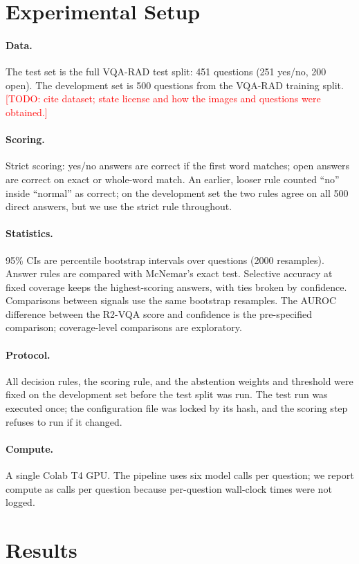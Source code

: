 \documentclass[11pt]{article}
\newcommand{\todo}[1]{\textcolor{red}{[TODO: #1]}}
\begin{document}
\section{Experimental Setup}
\paragraph{Data.} The test set is the full VQA-RAD test split: 451 questions (251 yes/no, 200 open). The development set is 500 questions from the VQA-RAD training split. \todo{cite dataset; state license and how the images and questions were obtained.}
\paragraph{Scoring.} Strict scoring: yes/no answers are correct if the first word matches; open answers are correct on exact or whole-word match. An earlier, looser rule counted ``no'' inside ``normal'' as correct; on the development set the two rules agree on all 500 direct answers, but we use the strict rule throughout.
\paragraph{Statistics.} 95\% CIs are percentile bootstrap intervals over questions (2000 resamples). Answer rules are compared with McNemar's exact test. Selective accuracy at fixed coverage keeps the highest-scoring answers, with ties broken by confidence. Comparisons between signals use the same bootstrap resamples. The AUROC difference between the R2-VQA score and confidence is the pre-specified comparison; coverage-level comparisons are exploratory.
\paragraph{Protocol.} All decision rules, the scoring rule, and the abstention weights and threshold were fixed on the development set before the test split was run. The test run was executed once; the configuration file was locked by its hash, and the scoring step refuses to run if it changed.
\paragraph{Compute.} A single Colab T4 GPU. The pipeline uses six model calls per question; we report compute as calls per question because per-question wall-clock times were not logged.

\section{Results}
\end{document}
